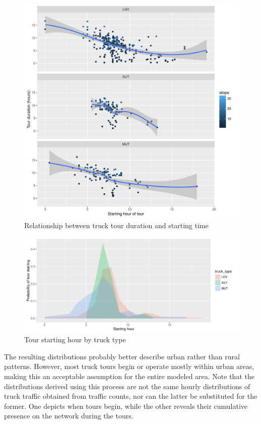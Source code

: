 \begin{figure}
\centering
\includegraphics[scale=0.65]{figures/tours-temporal-distribution1.pdf}
\caption{Relationship between truck tour duration and starting time}
\label{fig:ct-temporal-points}
\end{figure}

\begin{figure}
\centering
\includegraphics[scale=0.65]{figures/tours-temporal-distribution2.pdf}
\caption{Tour starting hour by truck type}
\label{fig:ct-temporal-distributions}
\end{figure}

The resulting distributions probably better describe urban rather than rural patterns. However, most truck tours begin or operate mostly within urban areas, making this an acceptable assumption for the entire modeled area. Note that the distributions derived using this process are not the same hourly distributions of truck traffic obtained from traffic counts, nor can the latter be substituted for the former. One depicts when tours begin, while the other reveals their cumulative presence on the network during the tours. 

